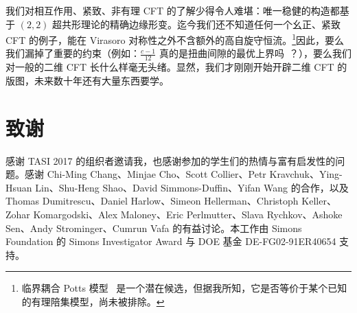 我们对相互作用、紧致、非有理 CFT 的了解少得令人难堪：唯一稳健的构造都基于 $(2,2)$ 超共形理论的精确边缘形变。迄今我们还不知道任何一个幺正、紧致 CFT 的例子，能在 Virasoro 对称性之外不含额外的高自旋守恒流。\footnote{临界耦合 Potts 模型~\cite{r54} 是一个潜在候选，但据我所知，它是否等价于某个已知的有理陪集模型，尚未被排除。}因此，要么我们漏掉了重要的约束（例如：$\frac{c-1}{12}$ 真的是扭曲间隙的最优上界吗~\cite{r58}？），要么我们对一般的二维 CFT 长什么样毫无头绪。显然，我们才刚刚开始开辟二维 CFT 的版图，未来数十年还有大量东西要学。


\section*{致谢}

感谢 TASI 2017 的组织者邀请我，也感谢参加的学生们的热情与富有启发性的问题。感谢 Chi-Ming Chang、Minjae Cho、Scott Collier、Petr Kravchuk、Ying-Hsuan Lin、Shu-Heng Shao、David Simmons-Duffin、Yifan Wang 的合作，以及 Thomas Dumitrescu、Daniel Harlow、Simeon Hellerman、Christoph Keller、Zohar Komargodski、Alex Maloney、Eric Perlmutter、Slava Rychkov、Ashoke Sen、Andy Strominger、Cumrun Vafa 的有益讨论。本工作由 Simons Foundation 的 Simons Investigator Award 与 DOE 基金 DE-FG02-91ER40654 支持。

